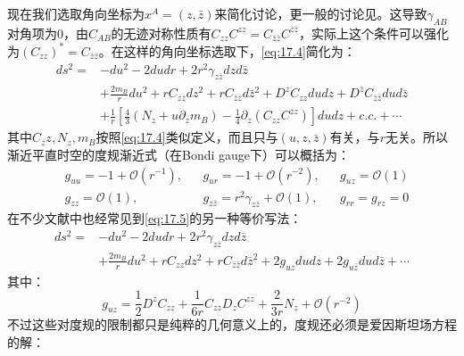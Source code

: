 现在我们选取角向坐标为$x^A=(z,\bar z)$来简化讨论，更一般的讨论见\cite{Compere:2019qed}。这导致$\gamma_{AB}$对角项为0，由$C_{AB}$的无迹对称性质有$C_{zz}C^{zz}=C_{\bar z\bar z}C^{\bar z\bar z}$，实际上这个条件可以强化为$(C_{zz})^*=C_{\bar z\bar z}$。在这样的角向坐标选取下，\ref{eq:17.4}简化为：
\begin{equation}\label{eq:17.5}
	\begin{aligned}
		ds^2=&-du^2-2dudr+2r^2\gamma_{z\bar z}dzd{\bar z}\\
		&+\frac{2m_B}{r}du^2+rC_{zz}dz^2+rC_{\bar z\bar z}d{\bar z}^2+D^z C_{zz}dudz+D^{\bar z}C_{\bar z\bar z}dud\bar z\\
		&+\frac{1}{r}\left[\frac{4}{3}\left(N_z+u\partial_zm_B\right)-\frac{1}{4}\partial_z\left(C_{zz}C^{zz}\right)\right]dudz+c.c.+\cdots
	\end{aligned}
\end{equation}
其中$C_zz,N_z,m_B$按照\ref{eq:17.4}类似定义，而且只与$(u,z,\bar z)$有关，与$r$无关。所以渐近平直时空的度规渐近式（在Bondi gauge下）可以概括为：
\begin{align*}
	&g_{uu}=-1+\mathcal{O}(r^{-1}),&&g_{ur}=-1+\mathcal{O}(r^{-2}),&&g_{uz}=\mathcal{O}(1)\\
	&g_{zz}=\mathcal{O}(1),&&g_{z\bar z}=r^2\gamma_{z\bar z}+\mathcal{O}(1),&&g_{rr}=g_{rz}=0
\end{align*}
在不少文献中\cite{Pasterski:2021rjz,Kapec:2014opa,Raclariu:2021zjz}也经常见到\ref{eq:17.5}的另一种等价写法：
\begin{equation}\label{eq:17.6}
	\begin{aligned}
		ds^2=&-du^2-2dudr+2r^2\gamma_{z\bar z}dzd{\bar z}\\
		&+\frac{2m_B}{r}du^2+rC_{zz}dz^2+rC_{\bar z\bar z}d{\bar z}^2+2g_{uz}dudz+2g_{u\bar z}dud\bar z+\cdots
	\end{aligned}
\end{equation}
其中：
\begin{equation}
	g_{uz}=\frac{1}{2}D^zC_{zz}+\frac{1}{6r}C_{zz}D_zC^{zz}+\frac{2}{3r}N_z+\mathcal{O}(r^{-2})
\end{equation}
不过这些对度规的限制都只是纯粹的几何意义上的，度规还必须是爱因斯坦场方程的解：
